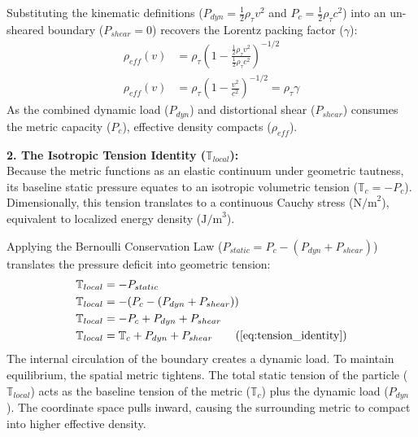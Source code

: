 Substituting the kinematic definitions ($P_{dyn} = \frac{1}{2}\rho_{\tau} v^2$ and $P_c = \frac{1}{2}\rho_{\tau} c^2$) into an un-sheared boundary ($P_{shear} = 0$) recovers the Lorentz packing factor ($\gamma$): 
\begin{align}
    \rho_{eff}(v) &= \rho_{\tau} \left( 1 - \frac{\frac{1}{2}\rho_{\tau} v^2}{\frac{1}{2}\rho_{\tau} c^2} \right)^{-1/2} \\
    \rho_{eff}(v) &= \rho_{\tau} \left( 1 - \frac{v^2}{c^2} \right)^{-1/2} = \rho_{\tau} \gamma \label{eq:density_lorentz_recovery}
\end{align}
As the combined dynamic load ($P_{dyn}$) and distortional shear ($P_{shear}$) consumes the metric capacity ($P_c$), effective density compacts ($\rho_{eff}$). 


\textbf{2. The Isotropic Tension Identity ($\mathbb{T}_{local}$):} \\
Because the metric functions as an elastic continuum under geometric tautness, its baseline static pressure equates to an isotropic volumetric tension ($\mathbb{T}_c = -P_c$). Dimensionally, this tension translates to a continuous Cauchy stress ($\text{N/m}^2$), equivalent to localized energy density ($\text{J/m}^3$). 

Applying the Bernoulli Conservation Law ($P_{static} = P_c - (P_{dyn} + P_{shear})$) translates the pressure deficit into geometric tension:
\begin{align}
    \mathbb{T}_{local} &= - P_{static} \\ 
    \mathbb{T}_{local} &= - (P_c - (P_{dyn} + P_{shear})) \\ 
    \mathbb{T}_{local} &= -P_c + P_{dyn} + P_{shear} \\ 
    \mathbb{T}_{local} &= \mathbb{T}_c + P_{dyn} + P_{shear} \tag{\ref{eq:tension_identity}}
\end{align}
The internal circulation of the boundary creates a dynamic load. To maintain equilibrium, the spatial metric tightens. The total static tension of the particle ($\mathbb{T}_{local}$) acts as the baseline tension of the metric ($\mathbb{T}_c$) plus the dynamic load ($P_{dyn}$). The coordinate space pulls inward, causing the surrounding metric to compact into higher effective density. 


